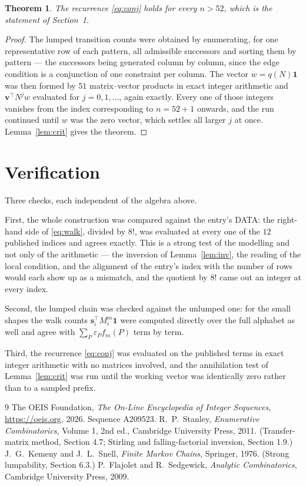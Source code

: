 \documentclass[11pt,a4paper]{article}
\theoremstyle{plain}
\newtheorem{theorem}{Theorem}
\theoremstyle{definition}
\begin{document}
\begin{theorem}
The recurrence \eqref{eq:conj} holds for every $n>52$, which is the statement of
Section~1.
\end{theorem}

\begin{proof}
The lumped transition counts were obtained by enumerating, for one representative row of
each pattern, all admissible successors and sorting them by pattern --- the successors being
generated column by column, since the edge condition is a conjunction of one constraint per
column. The vector $w=q(N)\mathbf{1}$ was then formed by $51$ matrix--vector products
in exact integer arithmetic and $\mathbf{v}^{\!\top}N^{j}w$ evaluated for
$j=0,1,\dots$, again exactly. Every one of those integers vanishes from the index
corresponding to $n=52+1$ onwards, and the run continued until $w$ was the zero vector,
which settles all larger $j$ at once. Lemma~\ref{lem:crit} gives the theorem.
\end{proof}

\section{Verification}

Three checks, each independent of the algebra above.

First, the whole construction was compared against the entry's DATA: the right-hand side of
\eqref{eq:walk}, divided by $8!$, was evaluated at every one of the $12$
published indices and agrees exactly. This is a strong test of the modelling and not only of
the arithmetic --- the inversion of Lemma~\ref{lem:inv}, the reading of the local
condition, and the alignment of the entry's index with the number of rows would each
show up as a mismatch, and the quotient by $8!$ came out an integer at every index.

Second, the lumped chain was checked against the unlumped one: for the small shapes the walk
counts $\mathbf{s}_i^{\!\top}M_i^{m}\mathbf{1}$ were computed directly over the full
alphabet as well and agree with $\sum_P\varepsilon_Pf_m(P)$ term by term.

Third, the recurrence \eqref{eq:conj} was evaluated on the published terms in exact integer
arithmetic with no matrices involved, and the annihilation test of Lemma~\ref{lem:crit} was
run until the working vector was identically zero rather than to a sampled prefix.

\begin{thebibliography}{9}
 The OEIS Foundation, \emph{The On-Line Encyclopedia of Integer
Sequences}, \url{https://oeis.org}, 2026. Sequence A209523.
 R.~P.~Stanley, \emph{Enumerative Combinatorics}, Volume 1, 2nd ed.,
Cambridge University Press, 2011. (Transfer-matrix method, Section 4.7; Stirling and
falling-factorial inversion, Section 1.9.)
 J.~G.~Kemeny and J.~L.~Snell, \emph{Finite Markov Chains}, Springer,
1976. (Strong lumpability, Section 6.3.)
 P.~Flajolet and R.~Sedgewick, \emph{Analytic Combinatorics}, Cambridge
University Press, 2009.
\end{thebibliography}
\end{document}
